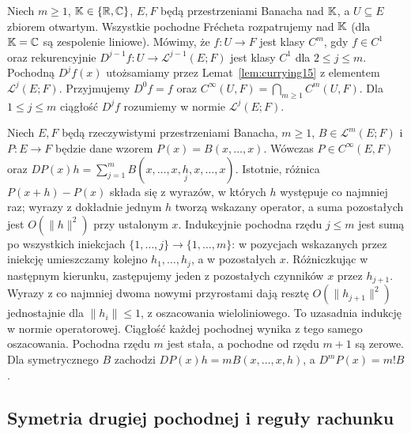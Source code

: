 \begin{definicja}
\label{def:ck15}
Niech $m\ge1$, $\mathbb K\in\{\mathbb R,\mathbb C\}$, $E,F$ będą przestrzeniami Banacha nad $\mathbb K$, a $U\subseteq E$ zbiorem otwartym. Wszystkie pochodne Frécheta rozpatrujemy nad $\mathbb K$ (dla $\mathbb K=\mathbb C$ są zespolenie liniowe). Mówimy, że $f:U\to F$ jest klasy $C^m$, gdy $f\in C^1$ oraz rekurencyjnie $D^{j-1}f:U\to\mathcal L^{j-1}(E;F)$ jest klasy $C^1$ dla $2\le j\le m$. Pochodną $D^jf(x)$ utożsamiamy przez Lemat~\ref{lem:currying15} z elementem $\mathcal L^j(E;F)$. Przyjmujemy $D^0f=f$ oraz $C^\infty(U,F)=\bigcap_{m\ge1}C^m(U,F)$. Dla $1\le j\le m$ ciągłość $D^jf$ rozumiemy w normie $\mathcal L^j(E;F)$.
\end{definicja}

\begin{przyklad}
\label{ex:multi-poly15}
Niech $E,F$ będą rzeczywistymi przestrzeniami Banacha, $m\ge1$, $B\in\mathcal L^m(E;F)$ i $P:E\to F$ będzie dane wzorem $P(x)=B(x,\ldots,x)$. Wówczas $P\in C^\infty(E,F)$ oraz
$DP(x)h=\sum_{j=1}^m B(x,\ldots,x,\underset{j}{h},x,\ldots,x)$.
Istotnie, różnica $P(x+h)-P(x)$ składa się z wyrazów, w których $h$ występuje co najmniej raz; wyrazy z dokładnie jednym $h$ tworzą wskazany operator, a suma pozostałych jest $O(\|h\|^2)$ przy ustalonym $x$. Indukcyjnie pochodna rzędu $j\le m$ jest sumą po wszystkich iniekcjach $\{1,\ldots,j\}\to\{1,\ldots,m\}$: w pozycjach wskazanych przez iniekcję umieszczamy kolejno $h_1,\ldots,h_j$, a w pozostałych $x$. Różniczkując w następnym kierunku, zastępujemy jeden z pozostałych czynników $x$ przez $h_{j+1}$. Wyrazy z co najmniej dwoma nowymi przyrostami dają resztę $O(\|h_{j+1}\|^2)$ jednostajnie dla $\|h_i\|\le1$, z oszacowania wieloliniowego. To uzasadnia indukcję w normie operatorowej. Ciągłość każdej pochodnej wynika z tego samego oszacowania. Pochodna rzędu $m$ jest stała, a pochodne od rzędu $m+1$ są zerowe. Dla symetrycznego $B$ zachodzi $DP(x)h=mB(x,\ldots,x,h)$, a $D^mP(x)=m!B$.
\end{przyklad}

\subsection{Symetria drugiej pochodnej i reguły rachunku}

